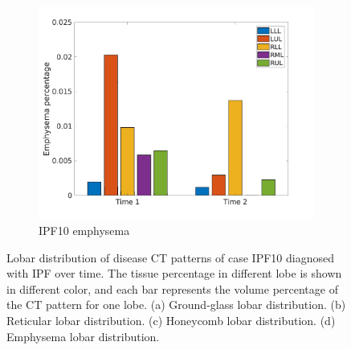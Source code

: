 \begin{figure}[H]
\begin{subfigure}{.46\linewidth}
  \includegraphics[width=\linewidth,trim={{.0\wd0} {.0\wd0} {.0\wd0} {.0\wd0}},clip]{Appendix/Image_AppexA/LobarDistribution/IPF10EmphysemaLobarRegionDiseaseDistributionOverTime.jpg}
  \caption{IPF10 emphysema}
  \label{fig:IPF10LobarRegionDiseaseDistributionOverTime-d}
\end{subfigure}
\caption{Lobar distribution of disease CT patterns of case IPF10 diagnosed with IPF over time. The tissue percentage in different lobe is shown in different color, and each bar represents the volume percentage of the CT pattern for one lobe. (a) Ground-glass lobar distribution. (b) Reticular lobar distribution. (c) Honeycomb lobar distribution. (d) Emphysema lobar distribution.}
\label{fig:IPF10LobarRegionDiseaseDistributionOverTime}
\end{figure}

